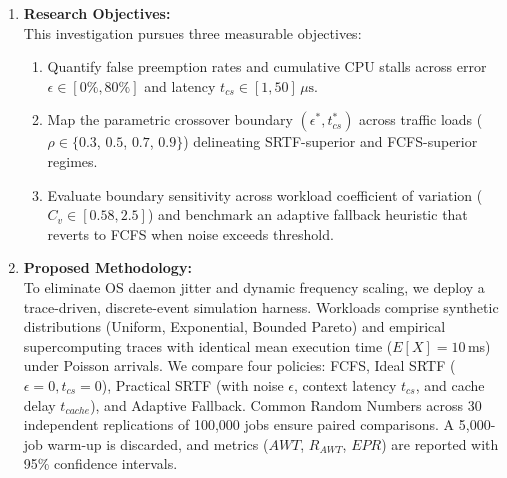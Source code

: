 \documentclass[11pt]{article}
\begin{document}
\begin{enumerate}[label=\textbf{\arabic*.}, leftmargin=1.4em, itemsep=0.45em, parsep=0pt]
    \item \textbf{Research Objectives:} \\
    This investigation pursues three measurable objectives:
    \begin{enumerate}[label=(\alph*), leftmargin=1.2em, itemsep=0.15em]
        \item Quantify false preemption rates and cumulative CPU stalls across error $\epsilon \in [0\%, 80\%]$ and latency $t_{cs} \in [1, 50]\,\mu\text{s}$.
        \item Map the parametric crossover boundary $(\epsilon^*, t_{cs}^*)$ across traffic loads ($\rho \in \{0.3$, $0.5$, $0.7$, $0.9\}$) delineating SRTF-superior and FCFS-superior regimes.
        \item Evaluate boundary sensitivity across workload coefficient of variation ($C_v \in [0.58, 2.5]$) and benchmark an adaptive fallback heuristic that reverts to FCFS when noise exceeds threshold.
    \end{enumerate}

    \item \textbf{Proposed Methodology:} \\
    To eliminate OS daemon jitter and dynamic frequency scaling, we deploy a trace-driven, discrete-event simulation harness. Workloads comprise synthetic distributions (Uniform, Exponential, Bounded Pareto) and empirical supercomputing traces with identical mean execution time ($E[X] = 10$\,ms) under Poisson arrivals. We compare four policies: FCFS, Ideal SRTF ($\epsilon=0, t_{cs}=0$), Practical SRTF (with noise $\epsilon$, context latency $t_{cs}$, and cache delay $t_{cache}$), and Adaptive Fallback. Common Random Numbers across 30 independent replications of 100,000 jobs ensure paired comparisons. A 5,000-job warm-up is discarded, and metrics ($AWT$, $R_{AWT}$, $EPR$) are reported with 95\% confidence intervals.

\end{enumerate}
\end{document}
